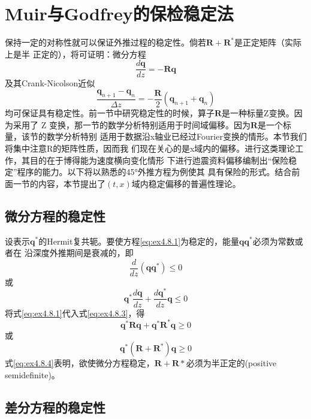 \section{Muir与Godfrey的保检稳定法}
\label{sec:4.8}

保持一定的对称性就可以保证外推过程的稳定性。倘若$\mathbf{R}+\mathbf{R^*}$是正定矩阵（实际上是半
正定的），将可证明：微分方程
\begin{equation}
\frac{d\mathbf{q}}{dz}=-\mathbf{Rq}
\label{eq:ex4.8.1}
\end{equation}
及其Crank-Nicolson近似
\begin{equation}
\frac{\mathbf{q}_{n+1}-\mathbf{q}_n}{\Delta z}=-\frac{\mathbf{R}}{2}(\mathbf{q}_{n+1}+\mathbf{q}_n)
\label{eq:ex4.8.2}
\end{equation}
均可保证具有稳定性。前一节中研究稳定性的时候，算子$\mathbf{R}$是一种标量Z变换。因为采用了
Z
变换，那一节的数学分析特别适用于时间域偏移。因为$\mathbf{R}$是一个标量，该节的数学分析特别
适用于数据沿x轴业已经过Fourier变换的情形。本节我们将集中注意R的矩阵性质，因而我
们现在关心的是x域内的偏移。进行这类理论工作，其目的在于博得能为速度横向变化情形
下进行迆震资料偏移编制出“保险稳定”程序的能力。以下将以熟悉的45°外推方程为例使其
具有保险的形式。结合前面一节的内容，本节提出了$(t,x)$域内稳定偏移的普遍性理论。

\subsection{微分方程的稳定性}
\label{sec:4.8.1}

设表示$\mathbf{q}^{*}$的Hermit复共轭。要使方程\ref{eq:ex4.8.1}为稳定的，能量$\mathbf{qq}^*$必须为常数或者在 沿深度外推期间是衰减的，即
\begin{equation*}
\frac{d}{dz}(\mathbf{qq}^*)\leq 0
\end{equation*}
或
\begin{equation}
\mathbf{q}^{*}\frac{d\mathbf{q}}{dz}+\frac{d\mathbf{q}^*}{dz}\mathbf{q}\leq 0
\label{eq:ex4.8.3}
\end{equation}
将式\ref{eq:ex4.8.1}代入式\ref{eq:ex4.8.3}，得
\begin{equation*}
\mathbf{q^*Rq}+\mathbf{q^*R^*q}\geq 0
\end{equation*}
或
\begin{equation}
\mathbf{q^*(R+R^*)q}\geq 0
\label{eq:ex4.8.4}
\end{equation}
式\ref{eq:ex4.8.4}表明，欲使微分方程稳定，$\mathbf{R +
R*}$必须为半正定的(positive semidefinite)。


\subsection{差分方程的稳定性}
\label{sec:4.8.2}

